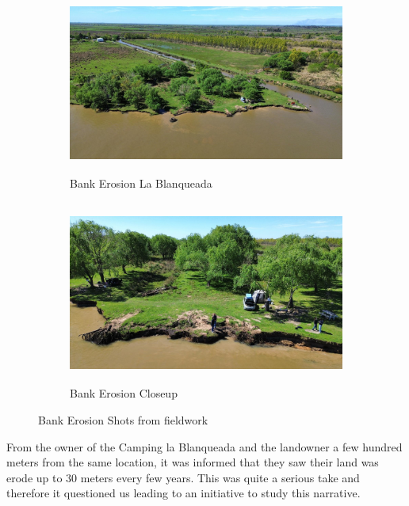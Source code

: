 \begin{figure}[H]
    \centering
    \begin{subfigure}[b]{0.6\textwidth}
        \includegraphics[width=\linewidth, height=6cm]{figures/ch4/bankerosioncamping.jpg}
        \caption{Bank Erosion La Blanqueada}
        
    \end{subfigure}
    
    \vspace{0.5cm}
    

    \begin{subfigure}[b]{0.6\textwidth}
        \includegraphics[width=\linewidth, height=6cm]{figures/ch4/bankerosioncamping2.jpg}
        \caption{Bank Erosion Closeup}
        
    \end{subfigure}
    \caption{Bank Erosion Shots from fieldwork}
    \label{fig:Bank Erosion shots from fieldwork}
\end{figure}
\label{bankerosion}


From the owner of the Camping la Blanqueada and the landowner a few hundred meters from the same location, it was informed that they saw their land was erode up to 30 meters every few years. This was quite a serious take and therefore it questioned us leading to an initiative to study this narrative.

